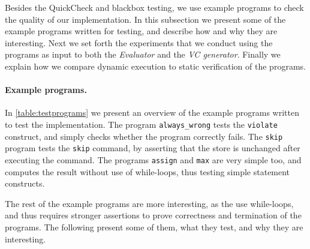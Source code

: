 Besides the QuickCheck and blackbox testing, we use example programs to check the quality of our implementation.
In this subsection we present some of the example programs written for testing, and describe how and why they are interesting.
Next we set forth the experiments that we conduct using the programs as input to both the \textit{Evaluator} and the \textit{VC generator}.
Finally we explain how we compare dynamic execution to static verification of the programs.

\paragraph{Example programs.}
In \cref{table:testprograms} we present an overview of the example programs written to test the implementation.
The program \texttt{always\_wrong} tests the \texttt{violate} construct, and simply checks whether the program correctly fails.
The \texttt{skip} program tests the \texttt{skip} command, by asserting that the store is unchanged after executing the command.
The programs \texttt{assign} and \texttt{max} are very simple too, and computes the result without use of while-loops, thus testing simple statement constructs.

The rest of the example programs are more interesting, as the use while-loops, and thus requires stronger assertions to prove correctness and termination of the programs.
The following present some of them, what they test, and why they are interesting.

